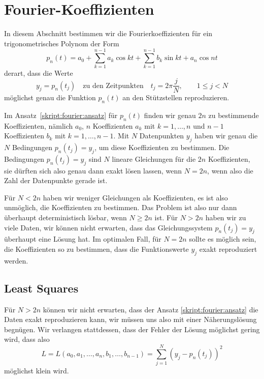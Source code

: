 %
%
%
\section{Fourier-Koeffizienten}
In diesem Abschnitt bestimmen wir die Fourierkoeffizienten für ein
trigonometrisches Polynom der Form
\begin{equation}
p_n(t)
=
a_0 + \sum_{k=1}^{n-1} a_k\cos kt + \sum_{k=1}^{n-1} b_k\sin kt + a_n\cos nt
\label{skript:fourier:ansatz}
\end{equation}
derart, dass die Werte
\begin{equation}
y_j = p_n(t_j)
\quad\text{zu den Zeitpunkten}\quad t_j=2\pi\frac{j}{N},\qquad 1\le j< N
\label{skript:fourier:gleichungen}
\end{equation}
möglichst genau die Funktion $p_n(t)$ an den Stützstellen reproduzieren.

Im Ansatz~\eqref{skript:fourier:ansatz} für $p_n(t)$ finden wir
genau $2n$ zu bestimmende Koeffizienten, nämlich $a_0$,
$n$ Koeffizienten $a_k$ mit $k=1,\dots,n$
und $n-1$ Koeffizienten $b_k$ mit $k=1,\dots,n-1$.
Mit $N$ Datenpunkten $y_j$ haben wir genau die $N$ Bedingungen
$p_n(t_j)=y_j$, um diese Koeffizienten zu bestimmen.
Die Bedingungen $p_n(t_j)=y_j$ sind $N$ lineare Gleichungen für die
$2n$ Koeffizienten, sie dürften sich also genau dann exakt lösen
lassen, wenn $N=2n$, wenn also die Zahl der Datenpunkte gerade ist.

Für $N<2n$ haben wir weniger Gleichungen als Koeffizienten, es ist
also unmöglich, die Koeffizienten zu bestimmen.
Das Problem ist also nur dann überhaupt deterministisch lösbar,
wenn $N\ge 2n$ ist.
Für $N>2n$ haben wir zu viele Daten, wir können nicht erwarten, dass
das Gleichungssystem $p_n(t_j)=y_j$ überhaupt eine Lösung hat.
Im optimalen Fall, für $N=2n$ sollte es möglich sein, die Koeffizienten so
zu bestimmen, dass die Funktionswerte $y_j$ exakt reproduziert werden.

\subsection{Least Squares}
Für $N>2n$ können wir nicht erwarten, dass der Ansatz
\eqref{skript:fourier:ansatz} die Daten exakt reproduzieren kann,
wir müssen uns also mit einer Näherungslösung begnügen.
Wir verlangen stattdessen, dass der Fehler der Lösung möglichst gering
wird, dass also
\[
L=L(a_0,a_1,\dots,a_n,b_1,\dots,b_{n-1})= \sum_{j=1}^N (y_j - p_n(t_j))^2
\]
möglichst klein wird.

